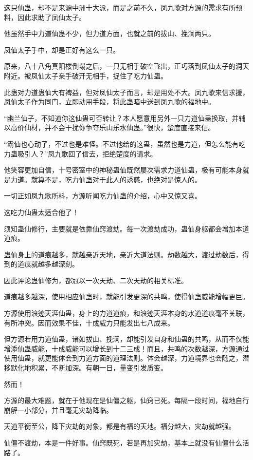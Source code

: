 \begin{this_body}
这只仙蛊，却不是来源中洲十大派，而是之前不久，凤九歌对方源的需求有所预料，因此求助了凤仙太子。

他虽然手中力道仙蛊不少，但力道方面，也就之前的拔山、挽澜两只。

凤仙太子手中，却是正好有这么一只。

原来，八十八角真阳楼倒塌之后，一只无相手破空飞出，正巧落到凤仙太子的洞天附近。被凤仙太子亲手破开无相手，捉住了吃力仙蛊。

此蛊对力道蛊仙大有裨益，但对凤仙太子而言，却是用处不大。凤九歌来信求援，凤仙太子作为同门，立即动用手段，将此蛊暗中送到凤九歌的福地中。

“幽兰仙子，不知道你这仙蛊可否转让？本人愿意用另外一只力道仙蛊换取，并辅以高价仙材，并不会干扰你争夺乐山乐水仙蛊。”很快，楚度直接来信。

“霸仙也心动了，不过也是难怪。不过他给的这蛊，虽然也是力道，但怎么能有吃力蛊吸引人？”凤九歌回了信去，拒绝楚度的请求。

他笑容更加自信，十号密室中的神秘蛊仙既然屡次需求力道仙蛊，极有可能本身就是力道。就算不是，吃力仙蛊对于此人的诱惑，也绝对是惊人的。

一切正如凤九歌所料，方源听闻吃力仙蛊的介绍，心中又惊又喜。

这吃力仙蛊太适合他了！

须知蛊仙修行，主要就是依靠仙窍渡劫。每一次渡劫成功，蛊仙身躯都会增加本道道痕。

蛊仙身上的道痕越多，就越亲近天地，亲近大道法则。劫数越大，渡过劫数后，得到的道痕就越多越深刻。

因此评论蛊仙修为，都冠以一次天劫、二次天劫的相关标准。

道痕越多越深，使用相应仙蛊时，就能引发更深的共鸣，使得仙蛊威能增幅更巨。

方源使用浪迹天涯仙蛊，身上的力道道痕，和浪迹天涯本身的水道道痕毫不关联，有所冲突。因而效果不佳，十成威力只能发出七八成来。

但方源若用力道仙蛊，诸如拔山、挽澜，却能引发自身和仙蛊的共鸣，从而不仅能增添仙蛊威能，十成威能可以增长到十二三成！而且，共鸣的次数越深，方源通过使用仙蛊，就更能体会到力道方面的道理法则。体会越深，力道境界也会随之，潜移默化地积累，不断加深。有朝一日，量变引发质变。

然而！

方源的最大难题，就在于他现在是仙僵之躯，仙窍已死。每隔一段时间，福地自行崩解一小部分，并且毫无灾劫降临。

天道平衡至公，降下灾劫的对象，都是有福的天地。福分越大，灾劫就越强。

仙僵不渡劫，本是一件好事。仙窍既死，若是再加灾劫，基本上就没有仙僵什么活路了。


\end{this_body}
